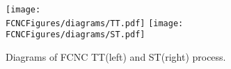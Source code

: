 
\begin{figure}[H]
\centering
\texttt{[image: \\FCNCFigures/diagrams/TT.pdf]}
\texttt{[image: \\FCNCFigures/diagrams/ST.pdf]}\\
\caption{ Diagrams of FCNC TT(left) and ST(right) process. }
\label{fig:diagrams}
\end{figure}